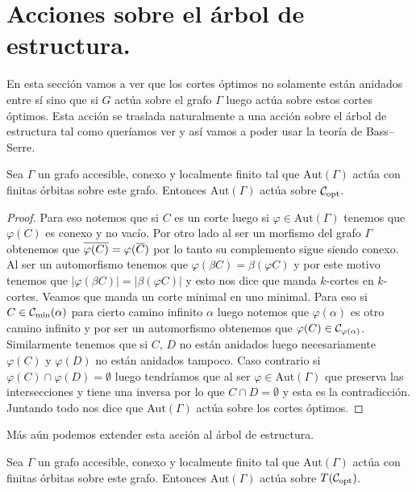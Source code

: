 \documentclass[tesis.tex]{subfiles}
\newcommand{\aut}{\text{Aut}}
\begin{document}
\section{Acciones sobre el árbol de estructura.}

En esta sección vamos a ver que los cortes óptimos no solamente están anidados entre sí sino que si $G$ actúa sobre el grafo $\Gamma$ luego actúa sobre estos cortes óptimos.
Esta acción se traslada naturalmente a una acción sobre el árbol de estructura tal como queríamos ver y así vamos a poder usar la teoría de Bass--Serre.



\begin{prop}
	Sea $\Gamma$ un grafo accesible, conexo y localmente finito tal que $\aut(\Gamma)$ actúa con finitas órbitas sobre este grafo.
	Entonces $\aut(\Gamma)$ actúa sobre ${\cal C}_{\text{opt}}$.
\end{prop}

\begin{proof}
	Para eso notemos que si $C$ es un corte luego si $\varphi \in \aut(\Gamma)$ tenemos que $\varphi(C)$ es conexo y no vacío. 
	Por otro lado al ser un morfismo del grafo $\Gamma$ obtenemos que $\overline{\varphi(C)} = \varphi(\overline C)$ por lo tanto su complemento sigue siendo conexo.
	Al ser un automorfismo tenemos que $\varphi(\beta C) = \beta (\varphi C)$ y por este motivo tenemos que $|\varphi (\beta C)| = |\beta (\varphi C)|$ y esto nos dice que manda $k$-cortes en $k$-cortes.
	Veamos que manda un corte minimal en uno minimal. 
	Para eso si $C \in {{\cal C}}_{\text{min}}(\alpha)$ para cierto camino infinito $\alpha$ luego notemos que $\varphi(\alpha)$ es otro camino infinito y por ser un automorfismo obtenemos que $\varphi(C) \in {\cal C}_{\varphi(\alpha)}$.
	Similarmente tenemos que si $C$, $D$ no están anidados luego necesariamente $\varphi(C)$ y $\varphi(D)$ no están anidados tampoco.
	Caso contrario si $\varphi(C) \cap \varphi(D) = \emptyset$ luego tendríamos que al ser $\varphi \in \aut(\Gamma)$ que preserva las intersecciones y tiene una inversa por lo que $C \cap D = \emptyset$ y esta es la contradicción.
	Juntando todo nos dice que $\aut(\Gamma)$ actúa sobre los cortes óptimos.
	
\end{proof}

Más aún podemos extender esta acción al árbol de estructura.

\begin{coro}
	Sea $\Gamma$ un grafo accesible, conexo y localmente finito tal que $\aut(\Gamma)$ actúa con finitas órbitas sobre este grafo.
	Entonces $\aut(\Gamma)$ actúa sobre $T({\cal C}_{\text{opt}})$.
\end{coro}
\end{document}
